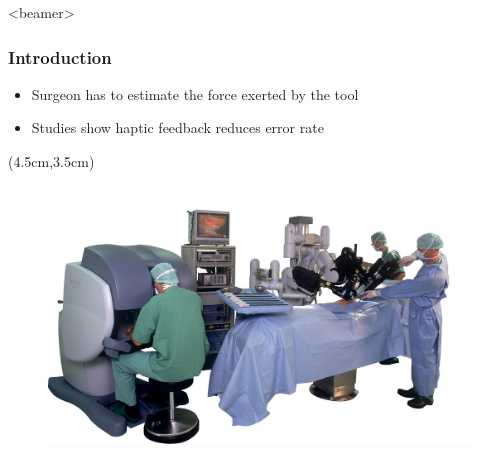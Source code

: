 \begin{frame}<beamer>
\frametitle{Introduction}
\begin{itemize}
\item Surgeon has to estimate the force exerted by the tool
\item Studies show haptic feedback reduces error rate
\end{itemize}

\begin{textblock*}{0.7\textwidth}(4.5cm,3.5cm) %
  \begin{figure}[H]
  	\centering
  		\centering
  		\includegraphics[width=1\textwidth]{Billeder/Dan/davinci.jpg}
  \end{figure}
\end{textblock*}

\end{frame}

